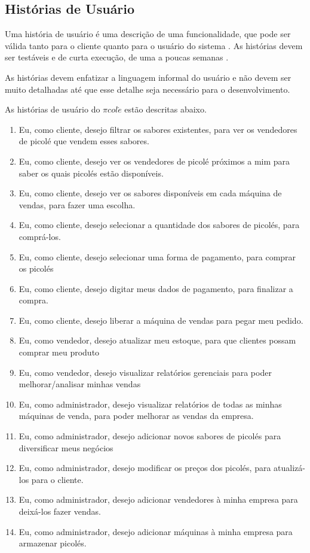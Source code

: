 \subsection{Histórias de Usuário}
\label{sec:historias}

Uma história de usuário é uma descrição de uma funcionalidade, que pode ser válida tanto para o cliente quanto para o usuário do sistema \cite{cohn2004user}. As histórias devem ser testáveis e de curta execução, de uma a poucas semanas \cite{breitman}.

As histórias devem enfatizar a linguagem informal do usuário e não devem ser muito detalhadas até que esse detalhe seja necessário para o desenvolvimento. \cite{cohn2004advantages}

As histórias de usuário do $\pi col\acute{e}$ estão descritas abaixo.

\begin{enumerate}
\item Eu, como cliente, desejo filtrar os sabores existentes, para ver os vendedores de picolé que vendem esses sabores.
\item Eu, como cliente, desejo ver os vendedores de picolé próximos a mim para saber os quais picolés estão disponíveis.
\item Eu, como cliente, desejo ver os sabores disponíveis em cada máquina de vendas, para fazer uma escolha.
\item Eu, como cliente, desejo selecionar a quantidade dos sabores de picolés, para comprá-los.
\item Eu, como cliente, desejo selecionar uma forma de pagamento, para comprar os picolés
\item Eu, como cliente, desejo digitar meus dados de pagamento, para finalizar a compra.
\item Eu, como cliente, desejo liberar a máquina de vendas para pegar meu pedido.

\item Eu, como vendedor, desejo atualizar meu estoque, para que clientes possam comprar meu produto
\item Eu, como vendedor, desejo visualizar relatórios gerenciais para poder melhorar/analisar minhas vendas

\item Eu, como administrador, desejo visualizar relatórios de todas as minhas máquinas de venda, para poder melhorar as vendas da empresa.
\item Eu, como administrador, desejo adicionar novos sabores de picolés para diversificar meus negócios
\item Eu, como administrador, desejo modificar os preços dos picolés, para atualizá-los para o cliente.
\item Eu, como administrador, desejo adicionar vendedores à minha empresa para deixá-los fazer vendas.
\item Eu, como administrador, desejo adicionar máquinas à minha empresa para armazenar picolés.
\end{enumerate}


